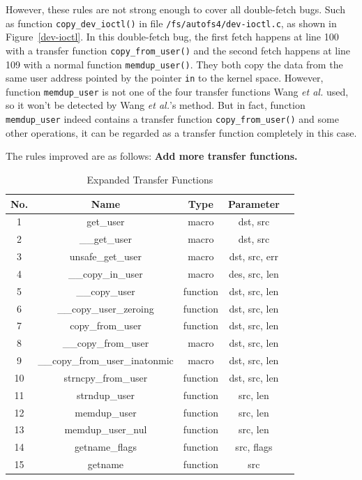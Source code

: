 \documentclass[10pt]{llncs}
\begin{document}
However, these rules are not strong enough to cover all double-fetch bugs. Such as function \verb:copy_dev_ioctl(): in file \verb:/fs/autofs4/dev-ioctl.c:, as shown in Figure~\ref{dev-ioctl}. In this double-fetch bug, the first fetch happens at line 100 with a transfer function \verb:copy_from_user(): and the second fetch happens at line 109 with a normal function \verb:memdup_user():. They both copy the data from the same user address pointed by the pointer \verb:in: to the kernel space. However, function \verb:memdup_user: is not one of the four transfer functions Wang \textit{et al.} used, so it won't be detected by Wang \textit{et al.}'s method. But in fact, function \verb:memdup_user: indeed contains a transfer function \verb:copy_from_user(): and some other operations, it can be regarded as a transfer function completely in this case.

The rules improved are as follows:
\textbf{Add more transfer functions.}

\begin{table}[t!]
\caption{Expanded Transfer Functions}
\centering
\begin{tabular}{ccccc} 
  \hline
  \textbf{No.} & \textbf{Name} & \textbf{Type} & \textbf{Parameter} \\
  \hline
  1 & get\_user & macro & dst, src \\
  2 & \_\_get\_user & macro & dst, src \\
  3 & unsafe\_get\_user & macro & dst, src, err \\
  4 & \_\_copy\_in\_user & macro & des, src, len \\
  5 & \_\_copy\_user & function & dst, src, len \\
  6 & \_\_copy\_user\_zeroing & function & dst, src, len \\
  7 & copy\_from\_user & function & dst, src, len \\
  8 & \_\_copy\_from\_user & macro & dst, src, len \\
  9 & \_\_copy\_from\_user\_inatonmic & macro & dst, src, len \\
  10 & strncpy\_from\_user & function & dst, src, len \\
  11 & strndup\_user & function & src, len \\
  12 & memdup\_user & function & src, len \\
  13 & memdup\_user\_nul & function & src, len \\
  14 & getname\_flags & function & src, flags \\
  15 & getname & function & src \\
  \hline
\end{tabular}
\label{transfer-func}
\end{table}
\end{document}

